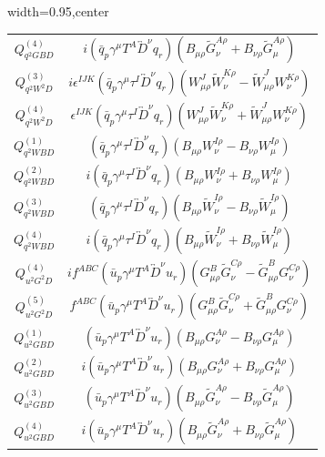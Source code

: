 \begin{table}[H]
\begin{center}
\begin{adjustbox}{width=0.95\textwidth,center}
\begin{minipage}[t]{7.4cm}
\begin{tabular}[t]{c|c}
%
$Q_{q^2GBD}^{(4)}$  &  $i (\bar q_p \gamma^\mu T^A \overleftrightarrow{D}^\nu q_r) (B_{\mu\rho} \widetilde{G}_\nu^{A \rho} + B_{\nu\rho} \widetilde{G}_\mu^{A \rho})$ \\
%
$Q_{q^2W^2D}^{(3)}$  &  $i \epsilon^{IJK} (\bar q_p \gamma^\mu \tau^I \overleftrightarrow{D}^\nu q_r) (W_{\mu\rho}^J \widetilde{W}_{\nu}^{K\rho} - \widetilde{W}_{\mu\rho}^J W_{\nu}^{K\rho})$ \\
%
$Q_{q^2W^2D}^{(4)}$  &  $\epsilon^{IJK} (\bar q_p \gamma^\mu \tau^I \overleftrightarrow{D}^\nu q_r) (W_{\mu\rho}^J \widetilde{W}_{\nu}^{K\rho} + \widetilde{W}_{\mu\rho}^J W_{\nu}^{K\rho})$ \\
%
$Q_{q^2WBD}^{(1)}$  &  $(\bar q_p \gamma^\mu \tau^I \overleftrightarrow{D}^\nu q_r) (B_{\mu\rho} W_{\nu}^{I\rho} - B_{\nu\rho} W_{\mu}^{I\rho})$ \\
%
$Q_{q^2WBD}^{(2)}$  &  $i (\bar q_p \gamma^\mu \tau^I \overleftrightarrow{D}^\nu q_r) (B_{\mu\rho} W_{\nu}^{I\rho} + B_{\nu\rho} W_{\mu}^{I\rho})$ \\
%
$Q_{q^2WBD}^{(3)}$  &  $(\bar q_p \gamma^\mu \tau^I \overleftrightarrow{D}^\nu q_r) (B_{\mu\rho}\widetilde{W}_\nu^{I \rho} - B_{\nu\rho} \widetilde W_\mu^{I \rho})$ \\
%
$Q_{q^2WBD}^{(4)}$  &  $i (\bar q_p \gamma^\mu \tau^I \overleftrightarrow{D}^\nu q_r) (B_{\mu\rho}\widetilde{W}_\nu^{I \rho} + B_{\nu\rho} \widetilde W_\mu^{I \rho})$ \\
%
$Q_{u^2G^2D}^{(4)}$  &  $i f^{ABC} (\bar u_p \gamma^\mu T^A \overleftrightarrow{D}^\nu u_r) (G_{\mu\rho}^B \widetilde{G}_{\nu}^{C\rho} - \widetilde{G}_{\mu\rho}^B G_{\nu}^{C\rho})$ \\
%
$Q_{u^2G^2D}^{(5)}$  &  $f^{ABC} (\bar u_p \gamma^\mu T^A \overleftrightarrow{D}^\nu u_r) (G_{\mu\rho}^B \widetilde{G}_{\nu}^{C\rho} + \widetilde{G}_{\mu\rho}^B G_{\nu}^{C\rho})$ \\
%
$Q_{u^2GBD}^{(1)}$  &  $(\bar u_p \gamma^\mu T^A \overleftrightarrow{D}^\nu u_r) (B_{\mu\rho} G_{\nu}^{A\rho} - B_{\nu\rho} G_{\mu}^{A\rho})$ \\
%
$Q_{u^2GBD}^{(2)}$  &  $i (\bar u_p \gamma^\mu T^A \overleftrightarrow{D}^\nu u_r) (B_{\mu\rho} G_{\nu}^{A\rho} + B_{\nu\rho} G_{\mu}^{A\rho})$ \\
%
$Q_{u^2GBD}^{(3)}$  &  $(\bar u_p \gamma^\mu T^A \overleftrightarrow{D}^\nu u_r) (B_{\mu\rho} \widetilde{G}_\nu^{A \rho} - B_{\nu\rho} \widetilde{G}_\mu^{A \rho})$ \\
%
$Q_{u^2GBD}^{(4)}$  &  $i (\bar u_p \gamma^\mu T^A \overleftrightarrow{D}^\nu u_r) (B_{\mu\rho} \widetilde{G}_\nu^{A \rho} + B_{\nu\rho} \widetilde{G}_\mu^{A \rho})$ \\

\end{tabular}
\end{minipage}
\end{adjustbox}
\end{center}
\end{table}
